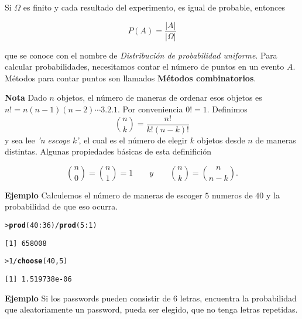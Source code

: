 \documentclass{article}\usepackage[]{graphicx}\usepackage[]{color}
\makeatletter
\newcommand{\hlnum}[1]{\textcolor[rgb]{0.686,0.059,0.569}{#1}}%
\newcommand{\hlopt}[1]{\textcolor[rgb]{0,0,0}{#1}}%
\newcommand{\hlstd}[1]{\textcolor[rgb]{0.345,0.345,0.345}{#1}}%
\newcommand{\hlkwd}[1]{\textcolor[rgb]{0.737,0.353,0.396}{\textbf{#1}}}%
\newenvironment{kframe}{%
 \def\at@end@of@kframe{}%
 \ifinner\ifhmode%
  \def\at@end@of@kframe{\end{minipage}}%
  \begin{minipage}{\columnwidth}%
 \fi\fi%
 \def\FrameCommand##1{\hskip\@totalleftmargin \hskip-\fboxsep
 \colorbox{shadecolor}{##1}\hskip-\fboxsep
     \hskip-\linewidth \hskip-\@totalleftmargin \hskip\columnwidth}%
 \MakeFramed {\advance\hsize-\width
   \@totalleftmargin\z@ \linewidth\hsize
   \@setminipage}}%
 {\par\unskip\endMakeFramed%
 \at@end@of@kframe}
\newenvironment{knitrout}{}{} %
\makeatother
\begin{document}
Si $\Omega $ es finito y cada resultado del experimento, es igual de probable, entonces

\[
P(A) = \frac{\vert A \vert}{\vert \Omega \vert}
\]

que se conoce con el nombre de \textit{Distribuci\'on de probabilidad uniforme}. Para calcular probabilidades, necesitamos contar el n\'umero de puntos en un evento $A$. M\'etodos para contar puntos son llamados \textbf{M\'etodos combinatorios}. 


\vspace{0.3cm}

\textbf{Nota} Dado $n$ objetos, el n\'umero de maneras de ordenar esos objetos es $n! = n(n -1)(n -2) \cdots 3.2.1$. Por conveniencia $0! = 1$. Definimos 
\[
\binom{n}{k} = \frac{n!}{k!(n - k)!}
\]
 y sea lee \textit{'n escoge k'}, el cual es el n\'umero de elegir $k$ objetos desde $n$ de maneras distintas. Algunas propiedades b\'asicas de esta definifici\'on
 
 \[
 \binom{n}{0} = \binom{n}{1} = 1 \qquad y \qquad \binom{n}{k} = \binom{n}{n - k}.
 \]
 
 
 \textbf{Ejemplo} Calculemos el n\'umero de maneras de escoger $5$ numeros de $40$ y la probabilidad de que eso ocurra.
 
 
\begin{knitrout}
\color{fgcolor}\begin{kframe}
\begin{alltt}
\hlstd{> }\hlkwd{prod}\hlstd{(}\hlnum{40}\hlopt{:}\hlnum{36}\hlstd{)}\hlopt{/}\hlkwd{prod}\hlstd{(}\hlnum{5}\hlopt{:}\hlnum{1}\hlstd{)}
\end{alltt}
\begin{verbatim}
[1] 658008
\end{verbatim}
\begin{alltt}
\hlstd{> }\hlnum{1}\hlopt{/}\hlkwd{choose}\hlstd{(}\hlnum{40}\hlstd{,}\hlnum{5}\hlstd{)}
\end{alltt}
\begin{verbatim}
[1] 1.519738e-06
\end{verbatim}
\end{kframe}
\end{knitrout}
 
 \vspace{0.5cm}
 
 
 \textbf{Ejemplo} Si los passwords pueden consistir de $6$ letras, encuentra la probabilidad que aleatoriamente un \mbox{password}, pueda ser elegido, que no tenga letras repetidas. 
 
\end{document}
